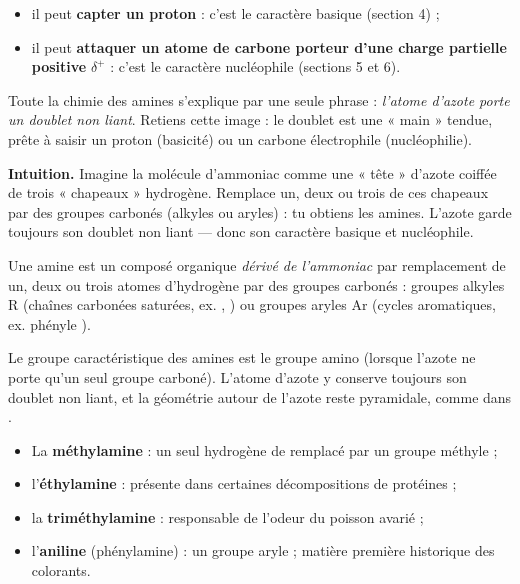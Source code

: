 \documentclass[11pt]{article}
\newcommand{\cle}[1]{{\popxbold\color{popdark}#1}}
\newcounter{popsec}
\newcounter{popsub}
\newcommand{\courssub}[1]{%
  \stepcounter{popsub}%
  \par\vspace{9pt}\noindent{\popxbold\fontsize{11.5}{13}\selectfont\color{popink}{\color{poporange}\thepopsec.\thepopsub}\hspace{6pt}#1}\par\nopagebreak\vspace{4pt}
}
\begin{document}
\begin{itemize}
  \item il peut \textbf{capter un proton}  : c'est le \cle{caractère basique} (section 4) ;
  \item il peut \textbf{attaquer un atome de carbone porteur d'une charge partielle positive} $\delta^+$ : c'est le \cle{caractère nucléophile} (sections 5 et 6).
\end{itemize}

\begin{aretenir}
Toute la chimie des amines s'explique par une seule phrase : \emph{l'atome d'azote porte un doublet non liant}. Retiens cette image : le doublet est une « main » tendue, prête à saisir un proton (basicité) ou un carbone électrophile (nucléophilie).
\end{aretenir}

\courssub{Définition des amines}

\textbf{Intuition.} Imagine la molécule d'ammoniac comme une « tête » d'azote coiffée de trois « chapeaux » hydrogène. Remplace un, deux ou trois de ces chapeaux par des groupes carbonés (alkyles ou aryles) : tu obtiens les amines. L'azote garde toujours son doublet non liant — donc son caractère basique et nucléophile.

\begin{definition}[Amine]
Une \cle{amine} est un composé organique \emph{dérivé de l'ammoniac}  par remplacement de un, deux ou trois atomes d'hydrogène par des groupes carbonés : groupes \cle{alkyles} $\mathrm{R}$ (chaînes carbonées saturées, ex. , ) ou groupes \cle{aryles} $\mathrm{Ar}$ (cycles aromatiques, ex. phényle ).
\end{definition}

Le groupe caractéristique des amines est le groupe \cle{amino}  (lorsque l'azote ne porte qu'un seul groupe carboné). L'atome d'azote y conserve toujours son doublet non liant, et la géométrie autour de l'azote reste pyramidale, comme dans .

\begin{exemplebox}
\begin{itemize}
  \item La \textbf{méthylamine}  : un seul hydrogène de  remplacé par un groupe méthyle ;
  \item l'\textbf{éthylamine}  : présente dans certaines décompositions de protéines ;
  \item la \textbf{triméthylamine}  : responsable de l'odeur du poisson avarié ;
  \item l'\textbf{aniline} (phénylamine)  : un groupe aryle ; matière première historique des colorants.
\end{itemize}
\end{exemplebox}
\end{document}

